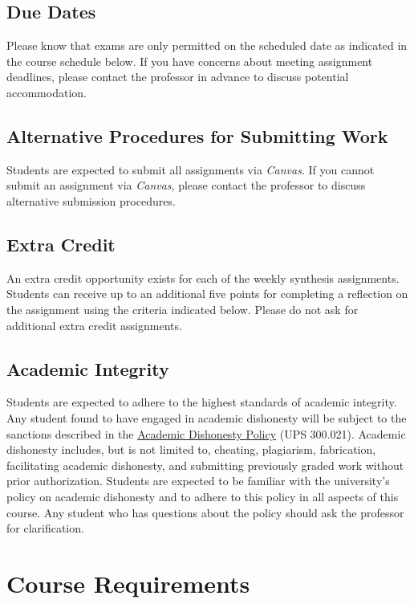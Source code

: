 \documentclass[12pt, letterpaper]{article}
\begin{document}
\subsection*{Due Dates}
Please know that exams are only permitted on the scheduled date as indicated in the course schedule below. If you have concerns about meeting assignment deadlines, please contact the professor in advance to discuss potential accommodation.

\subsection*{Alternative Procedures for Submitting Work}
Students are expected to submit all assignments via \emph{Canvas}. If you cannot submit an assignment via \emph{Canvas}, please contact the professor to discuss alternative submission procedures.

\subsection*{Extra Credit}
An extra credit opportunity exists for each of the weekly synthesis assignments. Students can receive up to an additional five points for completing a reflection on the assignment using the criteria indicated below. Please do not ask for additional extra credit assignments.

\subsection*{Academic Integrity}
Students are expected to adhere to the highest standards of academic integrity. Any student found to have engaged in academic dishonesty will be subject to the sanctions described in the \href{https://www.fullerton.edu/senate/publications_policies_resolutions/ups/UPS%20300/UPS%20300.021.pdf}{Academic Dishonesty Policy} (UPS 300.021). Academic dishonesty includes, but is not limited to, cheating, plagiarism, fabrication, facilitating academic dishonesty, and submitting previously graded work without prior authorization. Students are expected to be familiar with the university's policy on academic dishonesty and to adhere to this policy in all aspects of this course. Any student who has questions about the policy should ask the professor for clarification.


\section{Course Requirements}
\end{document}
